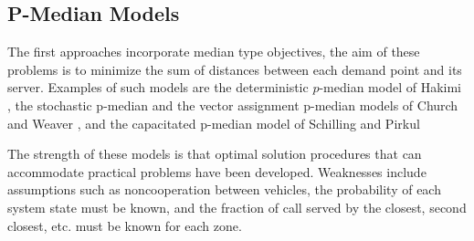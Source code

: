 \subsection{P-Median Models}
The first approaches
incorporate median type objectives,
the aim of these problems
is to minimize the sum of distances
between each demand point
and its server.
Examples of such models are
the deterministic $p$-median model of Hakimi \cite{hakimi1964optimum},
the stochastic p-median 
and the vector assignment p-median models
of Church and Weaver \cite{weaver1983computational,weaver1985median},
and the capacitated p-median model
of Schilling and Pirkul \cite{pirkul1988siting}

The strength of these models
is that optimal solution procedures
that can accommodate practical problems
have been developed.
Weaknesses include assumptions
such as noncooperation between vehicles,
the probability of each system state must be known,
and the fraction of call
served by the closest, second closest, etc.
must be known for each zone.
